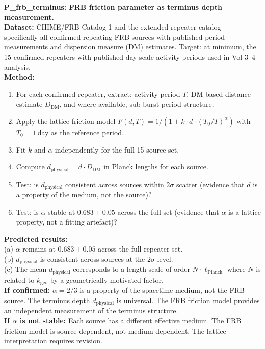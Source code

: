 \documentclass[11pt, letterpaper, openany]{book}
\begin{document}
\begin{predictionbox}
\textbf{P\_frb\_terminus: FRB friction parameter as terminus depth measurement.}\\[0.5em]
\textbf{Dataset:} CHIME/FRB Catalog 1 and the extended repeater catalog ---
specifically all confirmed repeating FRB sources with published period
measurements and dispersion measure (DM) estimates. Target: at minimum,
the 15 confirmed repeaters with published day-scale activity periods
used in Vol 3--4 analysis.\\[0.5em]
\textbf{Method:}
\begin{enumerate}
    \item For each confirmed repeater, extract: activity period $T$,
    DM-based distance estimate $D_\text{DM}$, and where available,
    sub-burst period structure.
    \item Apply the lattice friction model $F(d,T) = 1/(1+k \cdot d \cdot (T_0/T)^\alpha)$
    with $T_0 = 1$\,day as the reference period.
    \item Fit $k$ and $\alpha$ independently for the full 15-source set.
    \item Compute $d_\text{physical} = d \cdot D_\text{DM}$ in Planck lengths
    for each source.
    \item Test: is $d_\text{physical}$ consistent across sources within
    $2\sigma$ scatter (evidence that $d$ is a property of the medium, not
    the source)?
    \item Test: is $\alpha$ stable at $0.683 \pm 0.05$ across the full set
    (evidence that $\alpha$ is a lattice property, not a fitting artefact)?
\end{enumerate}
\textbf{Predicted results:}\\
(a) $\alpha$ remains at $0.683 \pm 0.05$ across the full repeater set.\\
(b) $d_\text{physical}$ is consistent across sources at the $2\sigma$ level.\\
(c) The mean $d_\text{physical}$ corresponds to a length scale of order
$N \cdot \ell_\text{Planck}$ where $N$ is related to $k_\text{geo}$ by
a geometrically motivated factor.\\[0.5em]
\textbf{If confirmed:} $\alpha = 2/3$ is a property of the spacetime medium,
not the FRB source. The terminus depth $d_\text{physical}$ is universal.
The FRB friction model provides an independent measurement of the terminus
structure.\\[0.5em]
\textbf{If $\alpha$ is not stable:} Each source has a different effective
medium. The FRB friction model is source-dependent, not medium-dependent.
The lattice interpretation requires revision.
\end{predictionbox}
\end{document}

